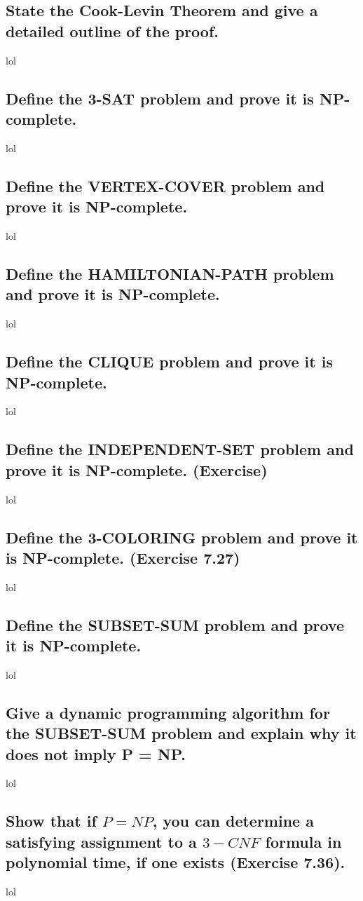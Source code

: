 \subsection{State the Cook-Levin Theorem and give a detailed outline of the proof.}
lol

\subsection{Define the 3-SAT problem and prove it is NP-complete.}
lol

\subsection{Define the VERTEX-COVER problem and prove it is NP-complete.}
lol

\subsection{Define the HAMILTONIAN-PATH problem and prove it is NP-complete.}
lol

\subsection{Define the CLIQUE problem and prove it is NP-complete.}
lol

\subsection{Define the INDEPENDENT-SET problem and prove it is NP-complete. (Exercise)}
lol

\subsection{Define the 3-COLORING problem and prove it is NP-complete. (Exercise 7.27)}
lol

\subsection{Define the SUBSET-SUM problem and prove it is NP-complete.}
lol

\subsection{Give a dynamic programming algorithm for the SUBSET-SUM problem and explain why it does not imply P = NP.}
lol

\subsection{Show that if $P = NP$, you can determine a satisfying assignment to a $3-CNF$ formula in polynomial time, if one exists (Exercise 7.36).}
lol

